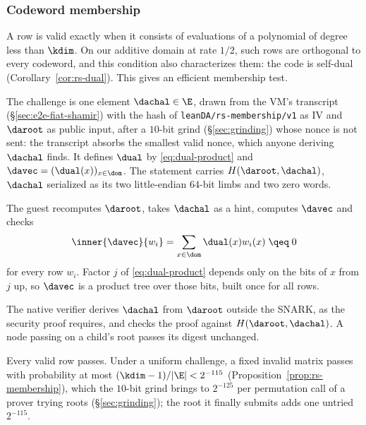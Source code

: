 \subsubsection{Codeword membership}\label{sec:da-membership}\label{sec:da-circuit}

A row is valid exactly when it consists of evaluations of a polynomial of degree less than $\kdim$. On our additive domain at rate $1/2$, such rows are orthogonal to every codeword, and this condition also characterizes them: the code is self-dual (Corollary~\ref{cor:rs-dual}). This gives an efficient membership test.

The challenge is one element $\dachal\in\E$, drawn from the VM's transcript (\S\ref{sec:e2e-fiat-shamir}) with the hash of \texttt{leanDA/rs-membership/v1} as IV and $\daroot$ as public input, after a $10$-bit grind (\S\ref{sec:grinding}) whose nonce is not sent: the transcript absorbs the smallest valid nonce, which anyone deriving $\dachal$ finds. It defines $\dual$ by \eqref{eq:dual-product} and $\davec=(\dual(x))_{x\in\dom}$. The statement carries $H(\daroot,\dachal)$, $\dachal$ serialized as its two little-endian $64$-bit limbs and two zero words.

The guest recomputes $\daroot$, takes $\dachal$ as a hint, computes $\davec$ and checks
\[
  \inner{\davec}{w_i}
  =\sum_{x\in\dom}\dual(x)w_i(x)
  \;\qeq\;0
\]
for every row $w_i$. Factor $j$ of \eqref{eq:dual-product} depends only on the bits of $x$ from $j$ up, so $\davec$ is a product tree over those bits, built once for all rows.

The native verifier derives $\dachal$ from $\daroot$ outside the SNARK, as the security proof requires, and checks the proof against $H(\daroot,\dachal)$. A node passing on a child's root passes its digest unchanged.

Every valid row passes. Under a uniform challenge, a fixed invalid matrix passes with probability at most $(\kdim-1)/|\E|<2^{-115}$ (Proposition~\ref{prop:rs-membership}), which the $10$-bit grind brings to $2^{-125}$ per permutation call of a prover trying roots (\S\ref{sec:grinding}); the root it finally submits adds one untried $2^{-115}$.
